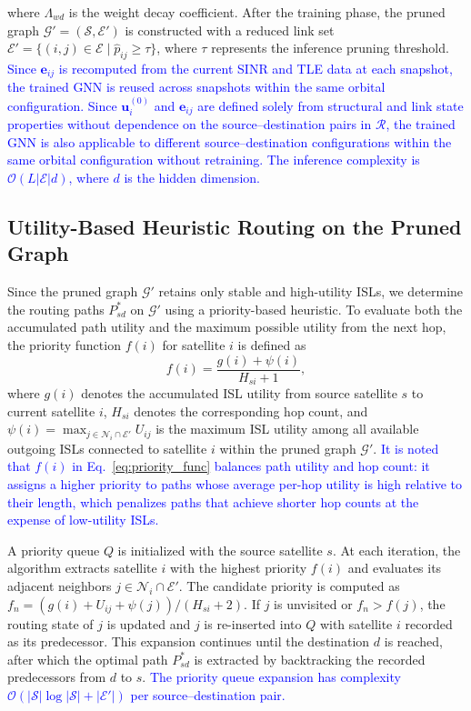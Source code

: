where $\Lambda_{wd}$ is the weight decay coefficient. After the training phase, the pruned graph $\mathcal{G}' = (\mathcal{S}, \mathcal{E}')$ is constructed with a reduced link set $\mathcal{E}' = \{ (i,j) \in \mathcal{E} \mid \hat{p}_{ij} \geq \tau \}$, where $\tau$ represents the inference pruning threshold. \textcolor{blue}{Since $\mathbf{e}_{ij}$ is recomputed from the current SINR and TLE data at each snapshot, the trained GNN is reused across snapshots within the same orbital configuration. Since $\mathbf{u}_i^{(0)}$ and $\mathbf{e}_{ij}$ are defined solely from structural and link state properties without dependence on the source--destination pairs in $\mathcal{R}$, the trained GNN is also applicable to different source--destination configurations within the same orbital configuration without retraining. The inference complexity is $\mathcal{O}(L|\mathcal{E}|d)$, where $d$ is the hidden dimension.}

\subsection{Utility-Based Heuristic Routing on the Pruned Graph}
\label{subsec:routing}

Since the pruned graph $\mathcal{G}'$ retains only stable and high-utility ISLs, we determine the routing paths $P_{sd}^*$ on $\mathcal{G}'$ using a priority-based heuristic. To evaluate both the accumulated path utility and the maximum possible utility from the next hop, the priority function $f(i)$ for satellite $i$ is defined as
\begin{equation} \label{eq:priority_func}
    f(i) = \frac{g(i) + \psi(i)}{H_{si} + 1},
\end{equation}
where $g(i)$ denotes the accumulated ISL utility from source satellite $s$ to current satellite $i$, $H_{si}$ denotes the corresponding hop count, and $\psi(i) = \max_{j \in \mathcal{N}_i \cap \mathcal{E}'} U_{ij}$ is the maximum ISL utility among all available outgoing ISLs connected to satellite $i$ within the pruned graph $\mathcal{G}'$. \textcolor{blue}{It is noted that $f(i)$ in Eq.~\eqref{eq:priority_func} balances path utility and hop count: it assigns a higher priority to paths whose average per-hop utility is high relative to their length, which penalizes paths that achieve shorter hop counts at the expense of low-utility ISLs.}

A priority queue $Q$ is initialized with the source satellite $s$. At each iteration, the algorithm extracts satellite $i$ with the highest priority $f(i)$ and evaluates its adjacent neighbors $j \in \mathcal{N}_i \cap \mathcal{E}'$. The candidate priority is computed as $f_n = (g(i) + U_{ij} + \psi(j)) / (H_{si} + 2)$. If $j$ is unvisited or $f_n > f(j)$, the routing state of $j$ is updated and $j$ is re-inserted into $Q$ with satellite $i$ recorded as its predecessor. This expansion continues until the destination $d$ is reached, after which the optimal path $P_{sd}^*$ is extracted by backtracking the recorded predecessors from $d$ to $s$. \textcolor{blue}{The priority queue expansion has complexity $\mathcal{O}(|\mathcal{S}|\log|\mathcal{S}| + |\mathcal{E}'|)$ per source--destination pair.}
